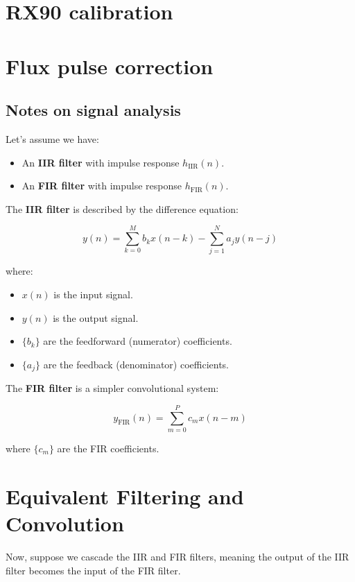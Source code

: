 \section{RX90 calibration}

\section{Flux pulse correction}
\subsection{Notes on signal analysis}
Let's assume we have:
\begin{itemize}
    \item An \textbf{IIR filter} with impulse response \( h_{\text{IIR}}(n) \).
    \item An \textbf{FIR filter} with impulse response \( h_{\text{FIR}}(n) \).
\end{itemize}

The \textbf{IIR filter} is described by the difference equation:

\begin{equation}
    y(n) = \sum_{k=0}^{M} b_k x(n-k) - \sum_{j=1}^{N} a_j y(n-j)
\end{equation}

where:
\begin{itemize}
    \item \( x(n) \) is the input signal.
    \item \( y(n) \) is the output signal.
    \item \( \{b_k\} \) are the feedforward (numerator) coefficients.
    \item \( \{a_j\} \) are the feedback (denominator) coefficients.
\end{itemize}

The \textbf{FIR filter} is a simpler convolutional system:

\begin{equation}
    y_{\text{FIR}}(n) = \sum_{m=0}^{P} c_m x(n-m)
\end{equation}

where \( \{c_m\} \) are the FIR coefficients.

\section{Equivalent Filtering and Convolution}

Now, suppose we cascade the IIR and FIR filters, meaning the output of the IIR filter becomes the input of the FIR filter.

